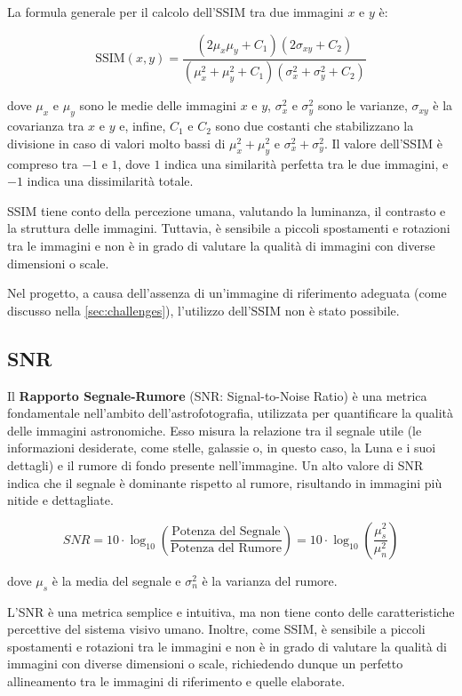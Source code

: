 La formula generale per il calcolo dell'SSIM tra due immagini $x$ e $y$ è:

$$
\text{SSIM}(x, y) = \frac{(2\mu_x\mu_y + C_1)(2\sigma_{xy} + C_2)}{(\mu_x^2 + \mu_y^2 + C_1)(\sigma_x^2 + \sigma_y^2 + C_2)}
$$

dove $\mu_x$ e $\mu_y$ sono le medie delle immagini $x$ e $y$, $\sigma_x^2$ e $\sigma_y^2$ sono le varianze, $\sigma_{xy}$ è la covarianza tra $x$ e $y$ e, infine, $C_1$ e $C_2$ sono due costanti che stabilizzano la divisione in caso di valori molto bassi di $\mu_x^2 + \mu_y^2$ e $\sigma_x^2 + \sigma_y^2$. Il valore dell'SSIM è compreso tra $-1$ e $1$, dove $1$ indica una similarità perfetta tra le due immagini, e $-1$ indica una dissimilarità totale.

SSIM tiene conto della percezione umana, valutando la luminanza, il contrasto e la struttura delle immagini. Tuttavia, è sensibile a piccoli spostamenti e rotazioni tra le immagini e non è in grado di valutare la qualità di immagini con diverse dimensioni o scale.

Nel progetto, a causa dell'assenza di un'immagine di riferimento adeguata (come discusso nella \cref{sec:challenges}), l'utilizzo dell'SSIM non è stato possibile.

\subsection{SNR} \label{subsec:snr}

Il \textbf{Rapporto Segnale-Rumore} (SNR: Signal-to-Noise Ratio) è una metrica fondamentale nell'ambito dell'astrofotografia, utilizzata per quantificare la qualità delle immagini astronomiche. Esso misura la relazione tra il segnale utile (le informazioni desiderate, come stelle, galassie o, in questo caso, la Luna e i suoi dettagli) e il rumore di fondo presente nell'immagine. Un alto valore di SNR indica che il segnale è dominante rispetto al rumore, risultando in immagini più nitide e dettagliate.

$$
SNR = 10 \cdot \log_{10} \left( \frac {\text{Potenza del Segnale}} {\text{Potenza del Rumore}} \right) = 10 \cdot \log_{10} \left( \frac{\mu_s^2}{\mu_n^2} \right)
$$

dove $\mu_s$ è la media del segnale e $\sigma_n^2$ è la varianza del rumore.

L'SNR è una metrica semplice e intuitiva, ma non tiene conto delle caratteristiche percettive del sistema visivo umano. Inoltre, come SSIM, è sensibile a piccoli spostamenti e rotazioni tra le immagini e non è in grado di valutare la qualità di immagini con diverse dimensioni o scale, richiedendo dunque un perfetto allineamento tra le immagini di riferimento e quelle elaborate.

